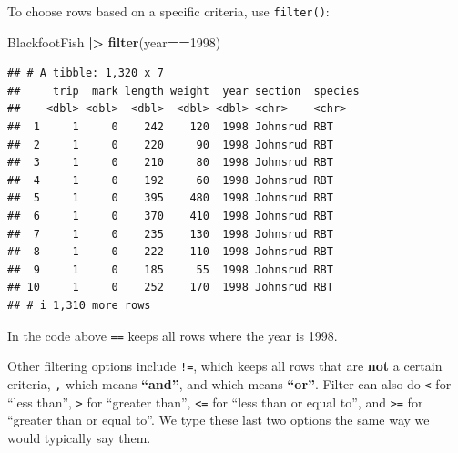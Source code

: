 \documentclass[
  10pt,
  letterpaper,
  twoside,
  openright]{book}
\newenvironment{Shaded}{\begin{snugshade}}{\end{snugshade}}
\newcommand{\DecValTok}[1]{\textcolor[rgb]{0.00,0.00,0.81}{#1}}
\newcommand{\FunctionTok}[1]{\textcolor[rgb]{0.13,0.29,0.53}{\textbf{#1}}}
\newcommand{\NormalTok}[1]{#1}
\newcommand{\SpecialCharTok}[1]{\textcolor[rgb]{0.81,0.36,0.00}{\textbf{#1}}}
\begin{document}
To choose rows based on a specific criteria, use \texttt{filter()}:

\begin{Shaded}
\begin{Highlighting}[]
\NormalTok{BlackfootFish }\SpecialCharTok{|\textgreater{}}
  \FunctionTok{filter}\NormalTok{(year}\SpecialCharTok{==}\DecValTok{1998}\NormalTok{)}
\end{Highlighting}
\end{Shaded}

\begin{verbatim}
## # A tibble: 1,320 x 7
##     trip  mark length weight  year section  species
##    <dbl> <dbl>  <dbl>  <dbl> <dbl> <chr>    <chr>  
##  1     1     0    242    120  1998 Johnsrud RBT    
##  2     1     0    220     90  1998 Johnsrud RBT    
##  3     1     0    210     80  1998 Johnsrud RBT    
##  4     1     0    192     60  1998 Johnsrud RBT    
##  5     1     0    395    480  1998 Johnsrud RBT    
##  6     1     0    370    410  1998 Johnsrud RBT    
##  7     1     0    235    130  1998 Johnsrud RBT    
##  8     1     0    222    110  1998 Johnsrud RBT    
##  9     1     0    185     55  1998 Johnsrud RBT    
## 10     1     0    252    170  1998 Johnsrud RBT    
## # i 1,310 more rows
\end{verbatim}

In the code above \texttt{==} keeps all rows where the year is 1998.

Other filtering options include \texttt{!=}, which keeps all rows that
are \textbf{not} a certain criteria, \texttt{,} which means
\textbf{``and''}, and \texttt{\textbar{}} which means \textbf{``or''}.
Filter can also do \texttt{\textless{}} for ``less than'',
\texttt{\textgreater{}} for ``greater than'', \texttt{\textless{}=} for
``less than or equal to'', and \texttt{\textgreater{}=} for ``greater
than or equal to''. We type these last two options the same way we would
typically say them.
\end{document}
